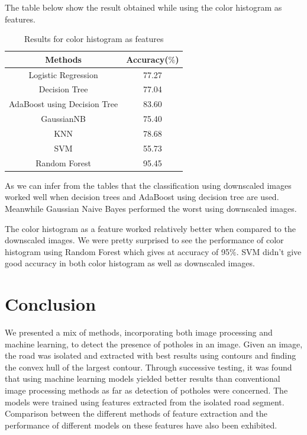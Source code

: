 \documentclass[journal]{IEEEtran}
\begin{document}
\vspace{0.5cm}

The table below show the result obtained while using the color histogram as features.
\begin{center}
\begin{table}[h!]
\centering
\begin{tabular}{ |c|c| } 
 \hline
 \rowcolor{gray}
 Methods & Accuracy($\%$)  \\ 
 \hline
 Logistic Regression & 77.27\\
 \hline
 Decision Tree & 77.04 \\ 
 \hline
 AdaBoost using Decision Tree & 83.60  \\ 
 \hline
 GaussianNB & 75.40 \\
 \hline
 KNN & 78.68\\
 \hline
 SVM & 55.73\\
 \hline
 Random Forest & 95.45\\
 \hline
\end{tabular}
\caption{Results for color histogram as features}
\label{table:1}
\end{table}
\end{center}

As we can infer from the tables that the classification using downscaled images worked well when decision trees and AdaBoost using decision tree are used. Meanwhile Gaussian Naive Bayes performed the worst using downscaled images.

\vspace{0.5cm}

The color histogram as a feature worked relatively better when compared to the downscaled images. We were pretty surprised to see the performance of color histogram using Random Forest which gives at accuracy of 
95$\%$. SVM didn't give good accuracy in both color histogram as well as downscaled images.

\section{Conclusion}
We presented a mix of methods, incorporating both image processing and machine learning, to detect the presence of potholes in an image. Given an image, the road was isolated and extracted with best results using contours and finding the convex hull of the largest contour. Through successive testing, it was found that using machine learning models yielded better results than conventional image processing methods as far as detection of potholes were concerned. The models were trained using features extracted from the isolated road segment. Comparison between the different methods of feature extraction and the performance of different models on these features have also been exhibited.
\end{document}
